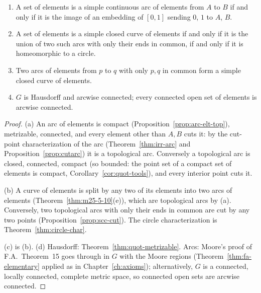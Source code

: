 \begin{proposition}\label{prop:elt-top}
\leavevmode
\begin{enumerate}[label=(\alph*)]
\item A set of elements is a simple continuous arc of elements from $A$ to $B$ if and only if it is the image of
an embedding of $[0,1]$ sending $0$, $1$ to $A$, $B$.
\item A set of elements is a simple closed curve of elements if and only if it is the union of two such arcs
with only their ends in common, if and only if it is homeomorphic to a circle.
\item Two arcs of elements from $p$ to $q$ with only $p,q$ in common form a simple closed curve of
elements.
\item $G$ is Hausdorff and arcwise connected; every connected open set of elements is arcwise connected.
\end{enumerate}
\end{proposition}

\begin{proof}
(a) An arc of elements is compact (Proposition~\ref{prop:arc-elt-top}), metrizable, connected, and every
element other than $A,B$ cuts it: by the cut-point characterization of the arc
(Theorem~\ref{thm:irr-arc} and Proposition~\ref{prop:cutarc}) it is a topological arc. Conversely a
topological arc is closed, connected, compact (so bounded: the point set of a compact set of elements is
compact, Corollary~\ref{cor:quot-tools}), and every interior point cuts it.

(b) A curve of elements is split by any two of its elements into two arcs of elements
(Theorem~\ref{thm:m25-5-10}(e)), which are topological arcs by (a). Conversely, two topological arcs with only
their ends in common are cut by any two points (Proposition~\ref{prop:scc-cut}). The circle characterization is
Theorem~\ref{thm:circle-char}.

(c) is (b). (d) Hausdorff: Theorem~\ref{thm:quot-metrizable}. Arcs: Moore's proof of F.A.\ Theorem~15 goes
through in $G$ with the Moore regions (Theorem~\ref{thm:fa-elementary} applied as in Chapter~\ref{ch:axioms});
alternatively, $G$ is a connected, locally connected, complete metric space, so connected open sets are
arcwise connected.
\end{proof}



